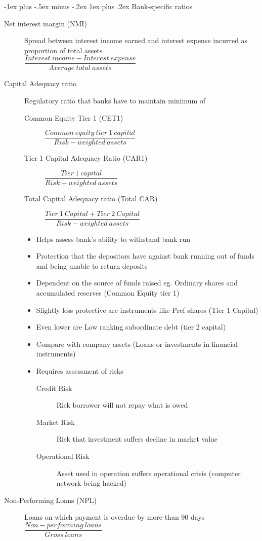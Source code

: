 \documentclass{article}
\makeatletter
\renewcommand{\subsubsection}{\@startsection{subsubsection}{3}{0mm}%
    {-1ex plus -.5ex minus -.2ex}%
    {1ex plus .2ex}%
{\normalfont\small\bfseries}}%
\makeatother
\begin{document}
\begin{multicols*}{3}
\subsubsection{Bank-specific ratios}
\begin{description}
	\item[Net interest margin (NMI)]{Spread between interest income earned and interest expense incurred as proportion of total assets}\\
	$\dfrac{Interest~income-Interest~expense}{Average~total~assets}$
	\item[Capital Adequacy ratio]{Regulatory ratio that banks have to maintain minimum of}
	\begin{description}
		\item[Common Equity Tier 1 (CET1)]
		$\dfrac{Common~equity~tier~1~capital}{Risk-weighted~assets}$
		\item[Tier 1 Capital Adequacy Ratio (CAR1)]
		$\dfrac{Tier~1~capital}{Risk-weighted~assets}$
		\item[Total Capital Adequacy ratio (Total CAR)]
		$\dfrac{Tier~1~Capital + Tier~2~Capital}{Risk-weighted~assets}$
	\end{description}
	\begin{itemize}
		\item Helps assess bank's ability to withstand bank run
		\item Protection that the depositors have against bank running out of funds and being unable to return deposits
		\item Dependent on the source of funds raised eg. Ordinary shares and accumulated reserves (Common Equity tier 1)
		\item Slightly less protective are instruments like Pref shares (Tier 1 Capital)
		\item Even lower are Low ranking subordinate debt (tier 2 capital)
		\item Compare with company assets (Loans or investments in financial instruments)
		\item Requires assessment of risks
		\begin{description}
			\item[Credit Risk]{Risk borrower will not repay what is owed}
			\item[Market Risk]{Risk that investment suffers decline in market value}
			\item[Operational Risk]{Asset used in operation suffers operational crisis (computer network being hacked)}
		\end{description}
	\end{itemize}
	\item[Non-Performing Loans (NPL)]{Loans on which payment is overdue by more than 90 days}\\
	$\dfrac{Non-performing~loans}{Gross~loans}$
\end{description}


\end{multicols*}
\end{document}
